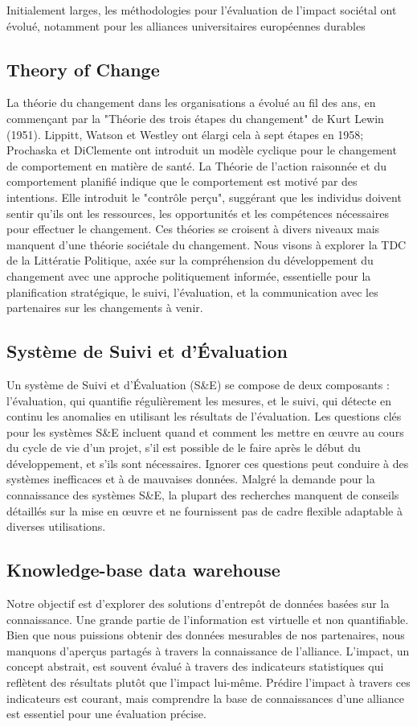 Initialement larges, les méthodologies pour l'évaluation de l'impact sociétal ont évolué, notamment pour les alliances universitaires européennes durables

\subsection{Theory of Change}
La théorie du changement dans les organisations a évolué au fil des ans, en commençant par la "Théorie des trois étapes du changement" de Kurt Lewin (1951). Lippitt, Watson et Westley ont élargi cela à sept étapes en 1958; Prochaska et DiClemente ont introduit un modèle cyclique pour le changement de comportement en matière de santé. La Théorie de l’action raisonnée et du comportement planifié indique que le comportement est motivé par des intentions. Elle introduit le "contrôle perçu", suggérant que les individus doivent sentir qu'ils ont les ressources, les opportunités et les compétences nécessaires pour effectuer le changement. Ces théories se croisent à divers niveaux mais manquent d'une théorie sociétale du changement. Nous visons à explorer la TDC de la Littératie Politique, axée sur la compréhension du développement du changement avec une approche politiquement informée, essentielle pour la planification stratégique, le suivi, l'évaluation, et la communication avec les partenaires sur les changements à venir.

\subsection{Système de Suivi et d'Évaluation }
Un système de Suivi et d'Évaluation (S\&E) se compose de deux composants : l'évaluation, qui quantifie régulièrement les mesures, et le suivi, qui détecte en continu les anomalies en utilisant les résultats de l'évaluation. Les questions clés pour les systèmes S\&E incluent quand et comment les mettre en œuvre au cours du cycle de vie d'un projet, s'il est possible de le faire après le début du développement, et s'ils sont nécessaires. Ignorer ces questions peut conduire à des systèmes inefficaces et à de mauvaises données. Malgré la demande pour la connaissance des systèmes S\&E, la plupart des recherches manquent de conseils détaillés sur la mise en œuvre et ne fournissent pas de cadre flexible adaptable à diverses utilisations.

\subsection{Knowledge-base data warehouse}
Notre objectif est d'explorer des solutions d'entrepôt de données basées sur la connaissance. Une grande partie de l'information est virtuelle et non quantifiable. Bien que nous puissions obtenir des données mesurables de nos partenaires, nous manquons d'aperçus partagés à travers la connaissance de l'alliance. L'impact, un concept abstrait, est souvent évalué à travers des indicateurs statistiques qui reflètent des résultats plutôt que l'impact lui-même. Prédire l'impact à travers ces indicateurs est courant, mais comprendre la base de connaissances d'une alliance est essentiel pour une évaluation précise. 